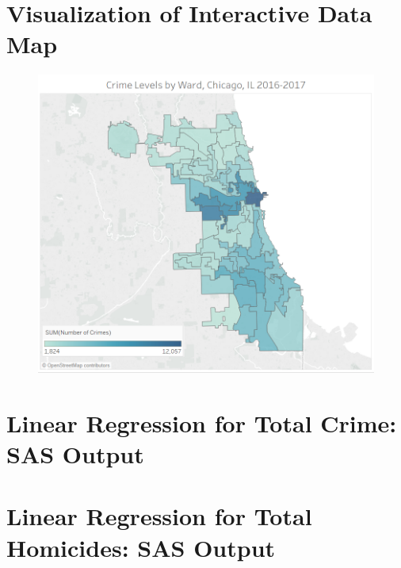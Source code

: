\documentclass[12pt]{article}
\begin{document}
\begin{appendices}
	
\section{Visualization of Interactive Data Map}


\begin{figure}[h]
	\includegraphics[scale=.9]{map_plot.png}
\end{figure}

\newpage
\section{Linear Regression for Total Crime:  SAS Output}
	


\section{Linear Regression for Total Homicides:  SAS Output}


	

\end{appendices}
\end{document}
